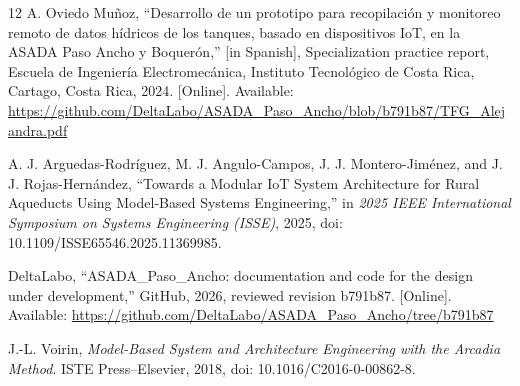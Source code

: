 \documentclass[conference]{IEEEtran}
\begin{document}
\begin{thebibliography}{12}
A. Oviedo Muñoz, ``Desarrollo de un prototipo para recopilación y monitoreo remoto de datos hídricos de los tanques, basado en dispositivos IoT, en la ASADA Paso Ancho y Boquerón,'' [in Spanish], Specialization practice report, Escuela de Ingeniería Electromecánica, Instituto Tecnológico de Costa Rica, Cartago, Costa Rica, 2024. [Online]. Available: \url{https://github.com/DeltaLabo/ASADA_Paso_Ancho/blob/b791b87/TFG_Alejandra.pdf}

A. J. Arguedas-Rodríguez, M. J. Angulo-Campos, J. J. Montero-Jiménez, and J. J. Rojas-Hernández, ``Towards a Modular IoT System Architecture for Rural Aqueducts Using Model-Based Systems Engineering,'' in \emph{2025 IEEE International Symposium on Systems Engineering (ISSE)}, 2025, doi: 10.1109/ISSE65546.2025.11369985.

DeltaLabo, ``ASADA\_Paso\_Ancho: documentation and code for the design under development,'' GitHub, 2026, reviewed revision b791b87. [Online]. Available: \url{https://github.com/DeltaLabo/ASADA_Paso_Ancho/tree/b791b87}

J.-L. Voirin, \emph{Model-Based System and Architecture Engineering with the Arcadia Method}. ISTE Press--Elsevier, 2018, doi: 10.1016/C2016-0-00862-8.

\end{thebibliography}
\end{document}
